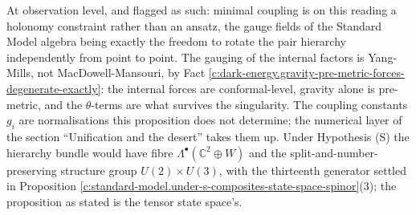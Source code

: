 \documentclass[11pt]{article}
\theoremstyle{definition}
\theoremstyle{plain}
\providecommand{\C}{}\renewcommand{\C}{\mathbb{C}}
\begin{document}
\label{c:note.standard-model.setting-content-charges-chirality-4}
At observation level, and flagged as such: minimal coupling is on this reading a holonomy constraint rather than an ansatz, the gauge fields of the Standard Model algebra being exactly the freedom to rotate the pair hierarchy independently from point to point. The gauging of the internal factors is Yang-Mills, not MacDowell-Mansouri, by Fact \ref{c:dark-energy.gravity-pre-metric-forces-degenerate-exactly}: the internal forces are conformal-level, gravity alone is pre-metric, and the $\theta$-terms are what survives the singularity. The coupling constants $g_{i}$ are normalisations this proposition does not determine; the numerical layer of the section ``Unification and the desert'' takes them up. Under Hypothesis (S) the hierarchy bundle would have fibre $\Lambda^{\bullet}(\C^{2} \oplus W)$ and the split-and-number-preserving structure group $U(2) \times U(3)$, with the thirteenth generator settled in Proposition \ref{c:standard-model.under-s-composites-state-space-spinor}(3); the proposition as stated is the tensor state space's.
\end{document}
